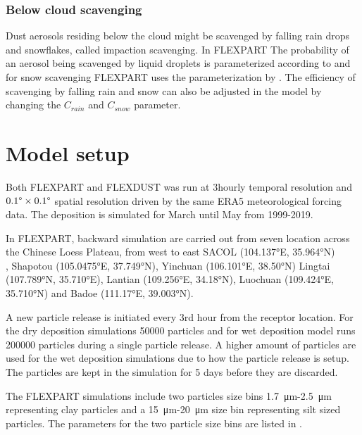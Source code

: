 \subsubsection{Below cloud scavenging}
Dust aerosols residing below the cloud might be scavenged by falling rain drops and snowflakes, called impaction scavenging. In FLEXPART The probability of an aerosol being scavenged by liquid droplets is parameterized according to \textcite{laakso2003ultrafine} and for snow scavenging FLEXPART uses the parameterization by \textcite{kyro2009snow}. The efficiency of scavenging by falling rain and snow can also be adjusted in the model by changing the $C_{rain}$ and $C_{snow}$ parameter.   


\section{Model setup}\label{sec:Model_setup}
Both FLEXPART and FLEXDUST was run at 3hourly temporal resolution and $0.1\degree \times 0.1\degree$ spatial resolution driven by the same ERA5 meteorological forcing data. The deposition is simulated for March until May from 1999-2019. 

In FLEXPART, backward simulation are carried out from seven location across the Chinese Loess Plateau, from west to east SACOL (\ang{104.137}E,  \ang{35.964}N)\\, Shapotou (\ang{105.0475}E,  \ang{37.749}N), Yinchuan (\ang{106.101}E, \ang{38.50}N) Lingtai \\ (\ang{107.789}N,  \ang{35.710}E), Lantian (\ang{109.256}E, \ang{34.18}N), Luochuan (\ang{109.424}E, \\  \ang{35.710}N) and  Badoe (\ang{111.17}E, \ang{39.003}N).

A new particle release is initiated every 3rd hour from the receptor location. For the dry deposition simulations 50000 particles and for wet deposition model runs 200000 particles during a single particle release. A higher amount of particles are used for the wet deposition simulations due to how the particle release is setup. The particles are kept in the simulation for 5 days before they are discarded. 

The FLEXPART simulations include two particles size bins \SI{1.7}{\micro\metre}-\SI{2.5}{\micro\metre} representing clay particles and a \SI{15}{\micro\metre}-\SI{20}{\micro\metre} size bin representing silt sized particles. The parameters for the two particle size bins are listed in . 

